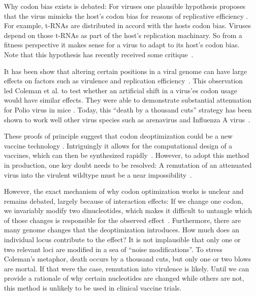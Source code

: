 Why codon bias exists is debated: For viruses one plausible hypothesis proposes that the virus mimicks the host's codon bias for reasons of replicative efficiency \cite{Wong2010-sy}. For example, t-RNAs are distributed in accord with the hosts codon bias. Viruses depend on those t-RNAs as part of the host's replication machinary. So from a fitness perspective it makes sense for a virus to adapt to its host's codon bias. Note that this hypothesis has recently received some critique~\cite{Komar2016-qx}.

It has been show that altering certain positions in a viral genome can have large effects on factors such as virulence and replication efficiency~\cite{Brault2007-wb}. This observation led Coleman et al. to test whether an artificial shift in a virus'es codon usage would have similar effects. They were able to demonstrate substantial attenuation for Polio virus in mice \cite{Mueller2006-fz, Coleman2008-nm}. Today, this ``death by a thousand cuts'' strategy has been shown to work well other virus species such as arenavirus \cite{Cheng2017-gu} and Influenza A virus~\cite{Mueller2010-qp, Nogales2014-eq, Fan2015-za}.

These proofs of principle suggest that codon deoptimization could be a new vaccine technology \cite{Plotkin2009-xx}. Intriguingly it allows for the computational design of a vaccines, which can then be synthesized rapidly~\cite{Andries2015-pl, Flingai2013-cf, Endy2005-eo}. However, to adopt this method in production, one key doubt needs to be resolved: A remutation of an attenuated virus into the virulent wildtype must be a near impossibility~\cite{Bull2015-fr}.

However, the exact mechanism of why codon optimization works is unclear and remains debated, largely because of interaction effects: If we change one codon, we invariably modify two dinucleotides, which makes it difficult to untangle which of those changes is responsible for the observed effect~\cite{Kunec2016-ri, Di_Giallonardo2017-lv}. Furthermore, there are many genome changes that the deoptimization introduces. How much does an individual locus contribute to the effect? It is not implausible that only one or two relevant loci are modified in a sea of ``noise modifications''. To stress Coleman's metaphor, death occurs by a thousand cuts, but only one or two blows are mortal. If that were the case, remutation into virulence is likely. Until we can provide a rationale of why certain nucleotides are changed while others are not, this method is unlikely to be used in clinical vaccine trials.

